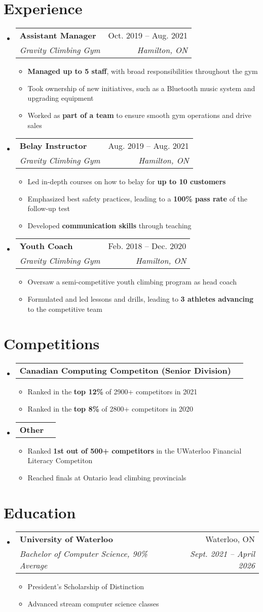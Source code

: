 \documentclass[letterpaper,11pt]{article}
\makeatletter
\newcommand{\resumeItem}[1]{
	\item\small{
		{#1 \vspace{-2pt}}
	}
}
\newcommand{\resumeSubheading}[4]{
	\vspace{-2pt}\item
		\begin{tabular*}{0.97\textwidth}[t]{l@{\extracolsep{\fill}}r}
			\textbf{#1} & #2 \\
			\textit{\small#3} & \textit{\small #4} \\
		\end{tabular*}\vspace{-7pt}
}
\newcommand{\resumeProjectHeading}[2]{
    \item
    \begin{tabular*}{0.97\textwidth}{l@{\extracolsep{\fill}}r}
      \small#1 & #2 \\
    \end{tabular*}\vspace{-7pt}
}
\newcommand{\resumeSubHeadingListStart}{\begin{itemize}[leftmargin=0.15in, label={}]}
\newcommand{\resumeSubHeadingListEnd}{\end{itemize}}
\newcommand{\resumeItemListStart}{\begin{itemize}}
\newcommand{\resumeItemListEnd}{\end{itemize}\vspace{-5pt}}
\makeatother
\begin{document}
\section{Experience}
\resumeSubHeadingListStart
	\resumeSubheading
		{Assistant Manager}{Oct. 2019 -- Aug. 2021}
		{Gravity Climbing Gym}{Hamilton, ON}
		\resumeItemListStart
			\resumeItem{\textbf{Managed up to 5 staff}, with broad responsibilities throughout the gym}
			\resumeItem{Took ownership of new initiatives, such as a Bluetooth music system and upgrading equipment}
			\resumeItem{Worked as \textbf{part of a team} to ensure smooth gym operations and drive sales}
		\resumeItemListEnd

	\resumeSubheading
		{Belay Instructor}{Aug. 2019 -- Aug. 2021}
		{Gravity Climbing Gym}{Hamilton, ON}
		\resumeItemListStart
			\resumeItem{Led in-depth courses on how to belay for \textbf{up to 10 customers}}
			\resumeItem{Emphasized best safety practices, leading to a \textbf{100\% pass rate} of the follow-up test}
			\resumeItem{Developed \textbf{communication skills} through teaching}
		\resumeItemListEnd

	\resumeSubheading
		{Youth Coach}{Feb. 2018 -- Dec. 2020}
		{Gravity Climbing Gym}{Hamilton, ON}
		\resumeItemListStart
			\resumeItem{Oversaw a semi-competitive youth climbing program as head coach}
			\resumeItem{Formulated and led lessons and drills, leading to \textbf{3 athletes advancing} to the competitive team}
		\resumeItemListEnd
\resumeSubHeadingListEnd


\section{Competitions}
\resumeSubHeadingListStart
	\resumeProjectHeading
		{\textbf{Canadian Computing Competiton (Senior Division)}}{}
		\resumeItemListStart
			\resumeItem{Ranked in the \textbf{top 12\%} of 2900+ competitors in 2021}
			\resumeItem{Ranked in the \textbf{top 8\%} of 2800+ competitors in 2020}
		\resumeItemListEnd
	\resumeProjectHeading
		{\textbf{Other}}{}
		\resumeItemListStart
			\resumeItem{Ranked \textbf{1st out of 500+ competitors} in the UWaterloo Financial Literacy Competiton}
			\resumeItem{Reached finals at Ontario lead climbing provincials}
		\resumeItemListEnd
\resumeSubHeadingListEnd


\section{Education}
\resumeSubHeadingListStart
	\resumeSubheading
		{University of Waterloo}{Waterloo, ON}
		{Bachelor of Computer Science, 90\% Average}{Sept. 2021 -- April 2026}
	\resumeItemListStart
		\resumeItem{President's Scholarship of Distinction}
		\resumeItem{Advanced stream computer science classes}
	\resumeItemListEnd
\resumeSubHeadingListEnd
\end{document}
